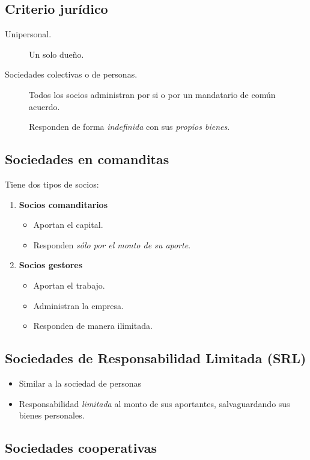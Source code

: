 \documentclass[10pt, spanish, a5paper]{article}
\begin{document}
\subsection{Criterio jurídico}

\begin{description}
	\item[Unipersonal.] Un solo dueño.
	\item[Sociedades colectivas o de personas.] Todos los socios administran por si o por un mandatario de común acuerdo.

	Responden de forma \emph{indefinida} con sus \emph{propios bienes}.
	
\end{description}

\subsection{Sociedades en comanditas}
Tiene dos tipos de socios:
\begin{enumerate}
	\item \textbf{Socios comanditarios}
	\begin{itemize}
		\item Aportan el capital.
		\item Responden \emph{sólo por el monto de su aporte}.
	\end{itemize}
	\item \textbf{Socios gestores}
	\begin{itemize}
		\item Aportan el trabajo.
		\item Administran la empresa.
		\item Responden de manera ilimitada.
	\end{itemize}
\end{enumerate}

\subsection{Sociedades de Responsabilidad Limitada (SRL)}

\begin{itemize}
	\item Similar a la sociedad de personas
	\item Responsabilidad \emph{limitada} al monto de sus aportantes, salvaguardando sus bienes personales.
\end{itemize}

\subsection{Sociedades cooperativas}
\end{document}
